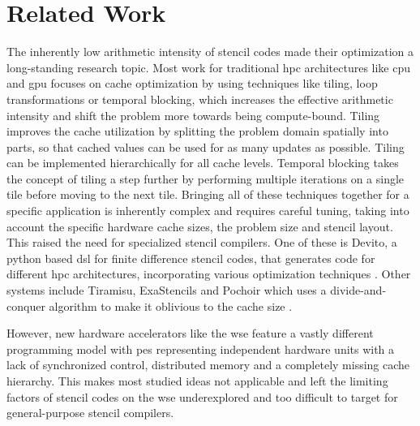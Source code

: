 \chapter{Related Work}
The inherently low arithmetic intensity of stencil codes made their optimization a long-standing research topic.
Most work for traditional \ac{hpc} architectures like \ac{cpu} and \ac{gpu} focuses on cache optimization by using techniques like tiling, loop transformations or temporal blocking, which increases the effective arithmetic intensity and shift the problem more towards being compute-bound.
Tiling improves the cache utilization by splitting the problem domain spatially into parts, so that cached values can be used for as many updates as possible.
Tiling can be implemented hierarchically for all cache levels.
Temporal blocking takes the concept of tiling a step further by performing multiple iterations on a single tile before moving to the next tile.
Bringing all of these techniques together for a specific application is inherently complex and requires careful tuning, taking into account the specific hardware cache sizes, the problem size and stencil layout.
This raised the need for specialized stencil compilers.
One of these is Devito, a python based \ac{dsl} for finite difference stencil codes, that generates code for different \ac{hpc} architectures, incorporating various optimization techniques \cite{lange2016devito}. 
Other systems include Tiramisu, ExaStencils and Pochoir which uses a divide-and-conquer algorithm to make it oblivious to the cache size \cite{baghdadi2019tiramisu,lengauer2014exastencils,tang2011pochoir}.

However, new hardware accelerators like the \ac{wse} feature a vastly different programming model with \acp{pe} representing independent hardware units with a lack of synchronized control, distributed memory and a completely missing cache hierarchy. 
This makes most studied ideas not applicable and left the limiting factors of stencil codes on the \ac{wse} underexplored and too difficult to target for general-purpose stencil compilers.

